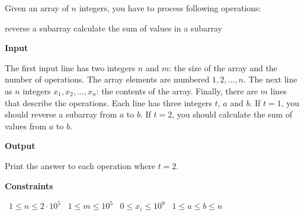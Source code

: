 Given an array of $n$ integers, you have to process following operations:

reverse a subarray
calculate the sum of values in a subarray

\vspace{0.3cm}\noindent\textbf{Input}

The first input line has two integers $n$ and $m$: the size of the array and the number of operations. The array elements are numbered $1,2,\dots,n$.
The next line as $n$ integers $x_1,x_2,\dots,x_n$: the contents of the array.
Finally, there are $m$ lines that describe the operations. Each line has three integers $t$, $a$ and $b$. If $t=1$, you should reverse a subarray from $a$ to $b$. If $t=2$, you should calculate the sum of values from $a$ to $b$.

\vspace{0.3cm}\noindent\textbf{Output}

Print the answer to each operation where $t=2$.

\vspace{0.3cm}\noindent\textbf{Constraints}

\textbullet\ $1 \le n \le 2 \cdot 10^5$
\textbullet\ $1 \le m \le 10^5$
\textbullet\ $0 \le x_i \le 10^9$
\textbullet\ $1 \le a \le b \le n$
